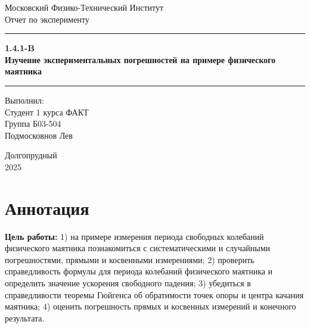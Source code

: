\documentclass[a4paper, 12pt]{article}
\begin{document}
\begin{titlepage}
    
    \begin{center}
        \vspace*{5cm}
        \Huge Московский Физико-Технический Институт
        \vspace*{2cm}\\
        \LARGE Отчет по эксперименту
        \\\vspace*{0.25cm}
        
        \noindent\rule{\textwidth}{1pt}
        \vspace*{-0.25cm}
        
        \huge \textbf{1.4.1-B\\ Изучение экспериментальных погрешностей на примере физического маятника}
        \noindent\rule{\textwidth}{1pt}


       \vfill
        \begin{flushright}
            \begin{minipage}{.4\textwidth}
            \Large Выполнил:\\ Студент 1 курса ФАКТ\\ Группа Б03-504 \\Подмосковнов Лев\\
            \end{minipage}
        \end{flushright}
        
        \vfill
        \normalsize Долгопрудный \\2025
        
    \end{center}
\end{titlepage}
\restoregeometry

\setcounter{page}{2}
\section*{Аннотация}
\noindent \textbf{Цель работы:} 1) на примере измерения периода свободных колебаний физического маятника познакомиться с систематическими и случайными погрешностями, прямыми и косвенными измерениями; 2) проверить справедливость формулы для периода колебаний физического маятника и определить значение ускорения свободного падения; 3) убедиться в справедливости теоремы Гюйгенса об обратимости точек опоры и центра качания маятника; 4) оценить погрешность прямых и косвенных измерений и конечного результата.
\end{document}
